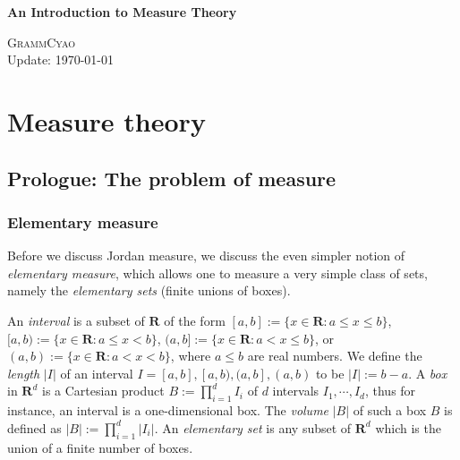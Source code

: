 \documentclass{book}
\theoremstyle{defstyle}
\theoremstyle{thmstyle}
\begin{document}
\setlength{\headheight}{14pt}
\large
\setlength\parindent{2em}

\begin{titlepage}
   {\indent\fontsize{30pt}{0pt}\textbf{An Introduction to Measure Theory}}

   \vfill
   {\indent\small{\textsc{GrammCyao}}}\\
   {\indent\small{Update: \today}}
\end{titlepage}

\thispagestyle{empty}
\tableofcontents
\thispagestyle{empty}
\cleardoublepage
\setcounter{page}{1}

\chapter{Measure theory}
\section{Prologue: The problem of measure}

\subsection{Elementary measure}

Before we discuss Jordan measure, we discuss the even simpler notion of \emph{elementary measure}, which allows one to measure a very simple class of sets, namely the \emph{elementary sets} (finite unions of boxes).

\begin{definition}\label{def:intervals, boxes, elementary sets}
    An \emph{interval} is a subset of $\mathbf{R}$ of the form $[a, b] := \{x \in \mathbf{R} : a \leq x \leq b\}$, $[a, b) := \{x \in \mathbf{R} : a \leq x < b\}$, $(a, b] := \{x \in \mathbf{R} : a < x \leq b\}$, or $(a, b) := \{x \in \mathbf{R} : a < x < b\}$, where $a \leq b$ are real numbers. We define the \emph{length} $|I|$ of an interval $I = [a, b], [a, b), (a, b], (a, b)$ to be $|I| := b - a$. A \emph{box} in $\mathbf{R}^d$ is a Cartesian product $B := \prod_{i = 1}^{d} I_i$ of $d$ intervals $I_1, \cdots, I_d$, thus for instance, an interval is a one-dimensional box. The \emph{volume} $|B|$ of such a box $B$ is defined as $|B| := \prod_{i = 1}^{d} |I_i|$. An \emph{elementary set} is any subset of $\mathbf{R}^d$ which is the union of a finite number of boxes.
\end{definition}
\end{document}
